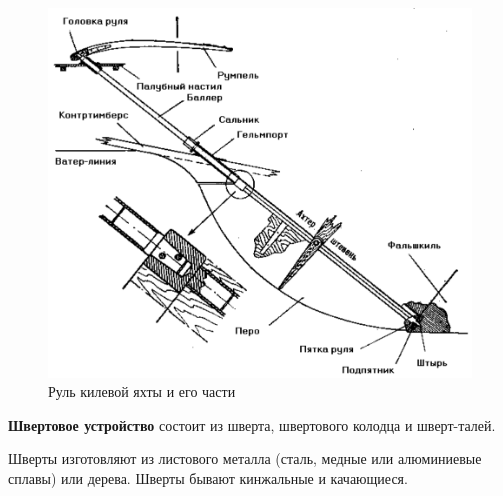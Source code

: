\documentclass[a4paper, 12pt, twoside, final]{scrbook}
\begin{document}
\begin{figure}[htbp]
\begin{centering}
\includegraphics{Rul_kilevoy_yakhty}
\par\end{centering}

\protect\caption{\label{fig:31}Руль килевой яхты и его части}


\end{figure}


\textbf{Швертовое устройство} состоит из шверта, швертового колодца
и шверт-талей.

Шверты изготовляют из листового металла (сталь, медные или алюминиевые
сплавы) или дерева. Шверты бывают кинжальные и качающиеся.
\end{document}
